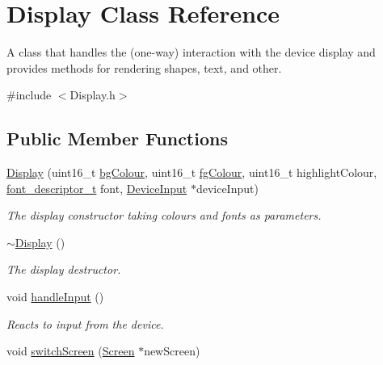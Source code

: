 \hypertarget{classDisplay}{}\section{Display Class Reference}
\label{classDisplay}


A class that handles the (one-\/way) interaction with the device display and provides methods for rendering shapes, text, and other.  




{\ttfamily \#include $<$Display.\+h$>$}

\subsection*{Public Member Functions}
\begin{DoxyCompactItemize}
\item 
\mbox{\hyperlink{classDisplay_a4cc5e14106323089582385c898cc234b}{Display}} (uint16\+\_\+t \mbox{\hyperlink{classDisplay_a23a0f9867d7ba82c45a3c612c84e0504}{bg\+Colour}}, uint16\+\_\+t \mbox{\hyperlink{classDisplay_aa6a2bd6e8f05a0794ff6b32c30723245}{fg\+Colour}}, uint16\+\_\+t highlight\+Colour, \mbox{\hyperlink{structfont__descriptor__t}{font\+\_\+descriptor\+\_\+t}} font, \mbox{\hyperlink{classDeviceInput}{Device\+Input}} $\ast$device\+Input)
\begin{DoxyCompactList}\small\item\em The display constructor taking colours and fonts as parameters. \end{DoxyCompactList}\item 
\mbox{\label{classDisplay_ac2607a6bb236c55547a4223d40d85d1f}} 
\mbox{\hyperlink{classDisplay_ac2607a6bb236c55547a4223d40d85d1f}{$\sim$\+Display}} ()
\begin{DoxyCompactList}\small\item\em The display destructor. \end{DoxyCompactList}\item 
\mbox{\label{classDisplay_a2bb4517715f7432775fe4be6d7ccf98e}} 
void \mbox{\hyperlink{classDisplay_a2bb4517715f7432775fe4be6d7ccf98e}{handle\+Input}} ()
\begin{DoxyCompactList}\small\item\em Reacts to input from the device. \end{DoxyCompactList}\item 
void \mbox{\hyperlink{classDisplay_a566e7cbce9f606a20787c6d42c189dc2}{switch\+Screen}} (\mbox{\hyperlink{classScreen}{Screen}} $\ast$new\+Screen)

\end{DoxyCompactItemize}
